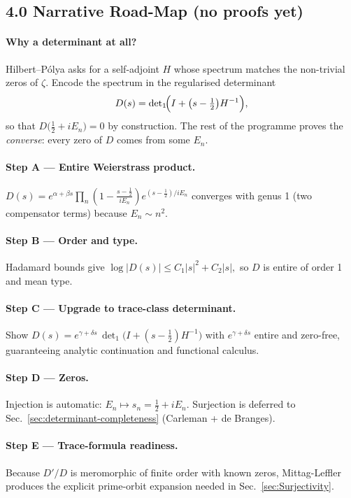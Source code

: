 \documentclass[11pt]{article}
\begin{document}
\subsection*{4.0  Narrative Road-Map (no proofs yet)}
\label{ssec:DetRoadmap}

\paragraph{Why a determinant at all?}
Hilbert–Pólya asks for a self-adjoint \(H\) whose spectrum matches
the non-trivial zeros of \(\zeta\).
Encode the spectrum in the regularised determinant
\[
   D(s)=\det\nolimits_{1}\!\Bigl(I+\bigl(s-\tfrac12\bigr)H^{-1}\Bigr),
\]
so that \(D\bigl(\tfrac12+iE_n\bigr)=0\) by construction.
The rest of the programme proves the \emph{converse}:
every zero of \(D\) comes from some \(E_n\).

\paragraph{Step A — Entire Weierstrass product.}
\(
   D(s)=e^{\alpha+\beta s}\prod_{n}(1-\tfrac{s-\tfrac12}{iE_n})
        e^{(s-\tfrac12)/iE_n}
\)
converges with genus 1 (two compensator terms) because
\(E_n\sim n^2\).

\paragraph{Step B — Order and type.}
Hadamard bounds give
\(
   \log|D(s)|\le C_1|s|^2+C_2|s| ,
\)
so \(D\) is entire of order 1 and mean type.

\paragraph{Step C — Upgrade to trace-class determinant.}
Show
\(
   D(s)=e^{\gamma+\delta s}\,
        \det\nolimits_{1}\!\bigl(I+(s-\tfrac12)H^{-1}\bigr)
\)
with \(e^{\gamma+\delta s}\) entire and zero-free, guaranteeing
analytic continuation and functional calculus.

\paragraph{Step D — Zeros.}
Injection is automatic:
\(E_n\mapsto s_n=\tfrac12+iE_n\).
Surjection is deferred to
Sec.~\ref{sec:determinant-completeness} (Carleman + de Branges).

\paragraph{Step E — Trace-formula readiness.}
Because \(D'/D\) is meromorphic of finite order with known zeros,
Mittag-Leffler produces the explicit prime-orbit expansion needed in
Sec.~\ref{sec:Surjectivity}.
\end{document}

